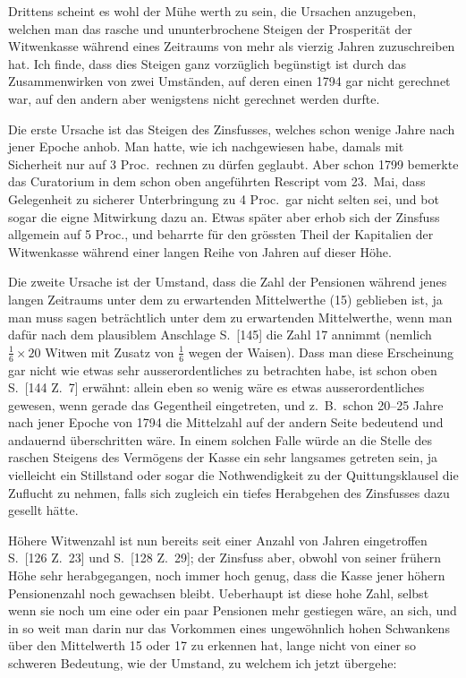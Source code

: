 \documentclass[12pt,a4paper]{article}
\begin{document}
Drittens scheint es wohl der M\"uhe werth zu sein, die Ursachen anzugeben, welchen man das rasche und ununterbrochene Steigen der Prosperit\"at der Witwenkasse w\"ahrend eines Zeitraums von mehr als vierzig Jahren zuzuschreiben hat. Ich finde, dass dies Steigen ganz vorz\"uglich beg\"unstigt ist durch das Zusammenwirken von zwei Umst\"anden, auf deren einen 1794 gar nicht gerechnet war, auf den andern aber wenigstens nicht gerechnet werden durfte.

Die erste Ursache ist das Steigen des Zinsfusses, welches schon wenige Jahre nach jener Epoche anhob. Man hatte, wie ich nachgewiesen habe, damals mit Sicherheit nur auf 3 Proc.\ rechnen zu d\"urfen geglaubt. Aber schon 1799 bemerkte das Curatorium in dem schon oben angef\"uhrten Rescript vom 23.\ Mai, dass Gelegenheit zu sicherer Unterbringung zu 4 Proc.\ gar nicht selten sei, und bot sogar die eigne Mitwirkung dazu an. Etwas sp\"ater aber erhob sich der Zinsfuss allgemein auf 5 Proc., und beharrte f\"ur den gr\"ossten Theil der Kapitalien der Witwenkasse w\"ahrend einer langen Reihe von Jahren auf dieser H\"ohe.

Die zweite Ursache ist der Umstand, dass die Zahl der Pensionen w\"ahrend jenes langen Zeitraums unter dem zu erwartenden Mittelwerthe (15) geblieben ist, ja man muss sagen betr\"achtlich unter dem zu erwartenden Mittelwerthe, wenn man daf\"ur nach dem plausiblem Anschlage S.\ [145] die Zahl 17 annimmt (nemlich $\frac{1}{6} \times 20$ Witwen mit Zusatz von $\frac{1}{6}$ wegen der Waisen). Dass man diese Erscheinung gar nicht wie etwas sehr ausserordentliches zu betrachten habe, ist schon oben S.\ [144 Z.\ 7] erw\"ahnt: allein eben so wenig w\"are es etwas ausserordentliches gewesen, wenn gerade das Gegentheil eingetreten, und z.\ B.\ schon 20--25 Jahre nach jener Epoche von 1794 die Mittelzahl auf der andern Seite bedeutend und andauernd \"uberschritten w\"are. In einem solchen Falle w\"urde an die Stelle des raschen Steigens des Verm\"ogens der Kasse ein sehr langsames getreten sein, ja vielleicht ein Stillstand oder sogar die Nothwendigkeit zu der Quittungsklausel die Zuflucht zu nehmen, falls sich zugleich ein tiefes Herabgehen des Zinsfusses dazu gesellt h\"atte.

H\"ohere Witwenzahl ist nun bereits seit einer Anzahl von Jahren eingetroffen S.\ [126 Z.\ 23] und S.\ [128 Z.\ 29]; der Zinsfuss aber, obwohl von seiner fr\"uhern H\"ohe sehr herabgegangen, noch immer hoch genug, dass die Kasse jener h\"ohern Pensionenzahl noch gewachsen bleibt. Ueberhaupt ist diese hohe Zahl, selbst wenn sie noch um eine oder ein paar Pensionen mehr gestiegen w\"are, an sich, und in so weit man darin nur das Vorkommen eines ungew\"ohnlich hohen Schwankens \"uber den Mittelwerth 15 oder 17 zu erkennen hat, lange nicht von einer so schweren Bedeutung, wie der Umstand, zu welchem ich jetzt \"ubergehe:
\end{document}
